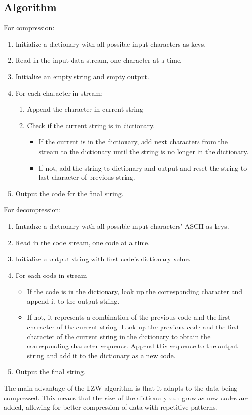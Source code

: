 \documentclass[12pt]{article}
\begin{document}
\subsection*{Algorithm}
For compression:
\begin{enumerate}
    \item Initialize a dictionary with all possible input characters as keys.
    \item Read in the input data stream, one character at a time.
    \item Initialize an empty string and empty output.
    \item For each character in stream:
    \begin{enumerate}
        \item Append the character in current string.
        \item Check if the current string is in dictionary.
        \begin{itemize}
            \item If the current is in the dictionary, add next characters from the stream to the dictionary until the string is no longer in the dictionary.
            \item If not, add the string to dictionary and output and reset the string to last character of previous string.
        \end{itemize}
    \end{enumerate}
    \item Output the code for the final string.
\end{enumerate}
For decompression:
\begin{enumerate}
    \item Initialize a dictionary with all possible input characters' ASCII as keys.
    \item Read in the code stream, one code at a time.
    \item Initialize a output string with first code's dictionary value.
    \item For each code in stream :
    \begin{itemize}
        \item If the code is in the dictionary, look up the corresponding character and append it to the output string.
        \item  If not, it represents a combination of the previous code and the first character of the current string. Look up the previous code and the first character of the current string in the dictionary to obtain the corresponding character sequence. Append this sequence to the output string and add it to the dictionary as a new code.
    \end{itemize}
    \item  Output the final string.
\end{enumerate}
The main advantage of the LZW algorithm is that it adapts to the data being compressed. This means that the size of the dictionary can grow as new codes are added, allowing for better compression of data with repetitive patterns.
\end{document}
